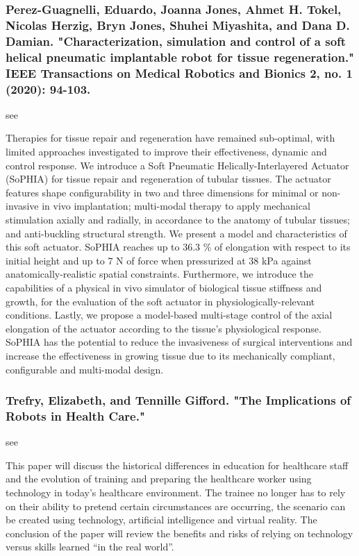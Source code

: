 \documentclass[conference]{IEEEtran}
\begin{document}
\medskip
\subsubsection{Perez-Guagnelli, Eduardo, Joanna Jones, Ahmet H. Tokel, Nicolas Herzig, Bryn Jones, Shuhei Miyashita, and Dana D. Damian. "Characterization, simulation and control of a soft helical pneumatic implantable robot for tissue regeneration." IEEE Transactions on Medical Robotics and Bionics 2, no. 1 (2020): 94-103.}
see \cite{perez2020characterization}

Therapies for tissue repair and regeneration have remained sub-optimal, with limited approaches investigated to improve their effectiveness, dynamic and control response. We introduce a Soft Pneumatic Helically-Interlayered Actuator (SoPHIA) for tissue repair and regeneration of tubular tissues. The actuator features shape configurability in two and three dimensions for minimal or non-invasive in vivo implantation; multi-modal therapy to apply mechanical stimulation axially and radially, in accordance to the anatomy of tubular tissues; and anti-buckling structural strength. We present a model and characteristics of this soft actuator. SoPHIA reaches up to 36.3 \% of elongation with respect to its initial height and up to 7 N of force when pressurized at 38 kPa against anatomically-realistic spatial constraints. Furthermore, we introduce the capabilities of a physical in vivo simulator of biological tissue stiffness and growth, for the evaluation of the soft actuator in physiologically-relevant conditions. Lastly, we propose a model-based multi-stage control of the axial elongation of the actuator according to the tissue's physiological response. SoPHIA has the potential to reduce the invasiveness of surgical interventions and increase the effectiveness in growing tissue due to its mechanically compliant, configurable and multi-modal design.

\medskip
\subsubsection{Trefry, Elizabeth, and Tennille Gifford. "The Implications of Robots in Health Care."}
see \cite{trefryimplications}

This paper will discuss the historical differences in education for healthcare staff and the evolution of training and preparing the healthcare worker using technology in today’s healthcare environment. The trainee no longer has to rely on their ability to pretend certain circumstances are occurring, the scenario can be created using technology, artificial intelligence and virtual reality. The conclusion of the paper will review the benefits and risks of relying on technology versus skills learned “in the real world”.
\end{document}
